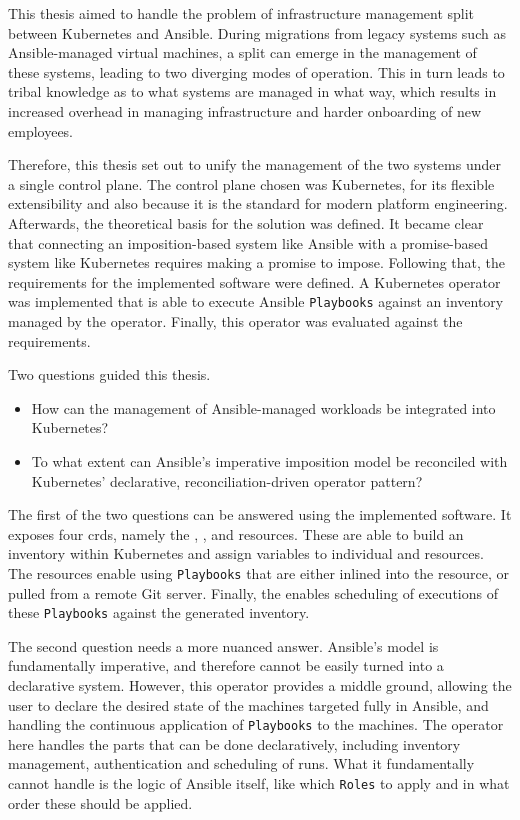 This thesis aimed to handle the problem of infrastructure management split between Kubernetes and Ansible.
During migrations from legacy systems such as Ansible-managed virtual machines, a split can emerge in the management of these systems, leading to two diverging modes of operation.
This in turn leads to tribal knowledge as to what systems are managed in what way, which results in increased overhead in managing infrastructure and harder onboarding of new employees.

Therefore, this thesis set out to unify the management of the two systems under a single control plane.
The control plane chosen was Kubernetes, for its flexible extensibility and also because it is the standard for modern platform engineering.
Afterwards, the theoretical basis for the solution was defined.
It became clear that connecting an imposition-based system like Ansible with a promise-based system like Kubernetes requires making a promise to impose.
Following that, the requirements for the implemented software were defined.
A Kubernetes operator was implemented that is able to execute Ansible \texttt{Playbooks} against an inventory managed by the operator.
Finally, this operator was evaluated against the requirements.

Two questions guided this thesis.

\begin{itemize}
	\item How can the management of Ansible-managed workloads be integrated into
	      Kubernetes?
	\item To what extent can Ansible's imperative imposition model be
	      reconciled with Kubernetes' declarative, reconciliation-driven operator
	      pattern?
\end{itemize}

\clearpage
The first of the two questions can be answered using the implemented software.
It exposes four \glspl{crd}, namely the \anhost, \angroup, \anplaybook and \anrecjob resources.
These are able to build an inventory within Kubernetes and assign variables to individual \anhost and \angroup resources.
The \anplaybook resources enable using \texttt{Playbooks} that are either inlined into the resource, or pulled from a remote Git server.
Finally, the \anrecjob enables scheduling of executions of these \texttt{Playbooks} against the generated inventory.

The second question needs a more nuanced answer.
Ansible's model is fundamentally imperative, and therefore cannot be easily turned into a declarative system.
However, this operator provides a middle ground, allowing the user to declare the desired state of the machines targeted fully in Ansible, and handling the continuous application of \texttt{Playbooks} to the machines.
The operator here handles the parts that can be done declaratively, including inventory management, authentication and scheduling of runs.
What it fundamentally cannot handle is the logic of Ansible itself, like which \texttt{Roles} to apply and in what order these should be applied.

